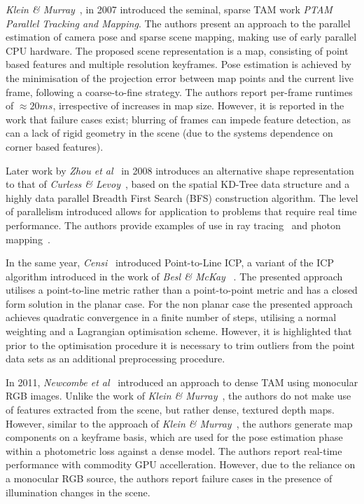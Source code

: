 \textit{Klein \& Murray}~\cite{Klein2007}, in 2007 introduced the seminal, sparse TAM work 
\textit{PTAM\: Parallel Tracking and Mapping}. The authors present an approach to the parallel 
estimation of camera pose and sparse scene mapping, making use of early parallel CPU hardware. 
The proposed scene representation is a map, consisting of point based features and multiple resolution 
keyframes. Pose estimation is achieved by the minimisation of the projection error between map points and 
the current live frame, following a coarse-to-fine strategy. The authors report per-frame runtimes of 
\( \approx 20ms \), irrespective of increases in map size. However, it is reported in the work that failure 
cases exist; blurring of frames can impede feature detection, as can a lack of rigid geometry in the scene (due 
to the systems dependence on corner based features).

Later work by \textit{Zhou et al}~\cite{Zhou2008} in 2008 introduces an alternative 
shape representation to that of \textit{Curless \& Levoy}~\cite{Curless1996}, based 
on the spatial KD-Tree data structure and a highly data parallel Breadth First 
Search (BFS) construction algorithm. The level of parallelism introduced allows for 
application to problems that require real time performance. The authors provide 
examples of use in ray tracing~\cite{Purcell2002} and photon mapping~\cite{Kajiya1986}.

In the same year, \textit{Censi}~\cite{Censi2008} introduced Point-to-Line ICP, a 
variant of the ICP algorithm introduced in the work of \textit{Besl \& McKay} 
~\cite{Besl1992}. The presented approach utilises a point-to-line metric rather than 
a point-to-point metric and has a closed form solution in the planar case. For the non 
planar case the presented approach achieves quadratic convergence in a finite number of 
steps, utilising a normal weighting and a Lagrangian optimisation scheme. However, it is 
highlighted that prior to the optimisation procedure it is necessary to trim outliers 
from the point data sets as an additional preprocessing procedure.

In 2011, \textit{Newcombe et al}~\cite{Newcombe2011_2} introduced an approach to dense TAM 
using monocular RGB images. Unlike the work of \textit{Klein \& Murray}~\cite{Klein2007}, the 
authors do not make use of features extracted from the scene, but rather dense, textured depth 
maps. However, similar to the approach of \textit{Klein \& Murray}~\cite{Klein2007}, the authors 
generate map components on a keyframe basis, which are used for the pose estimation phase within 
a photometric loss against a dense model. The authors report real-time performance with commodity 
GPU accelleration. However, due to the reliance on a monocular RGB source, the authors report failure 
cases in the presence of illumination changes in the scene.

